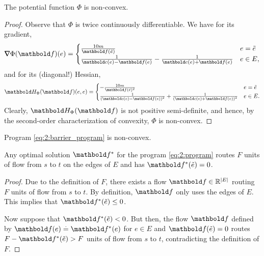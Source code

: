 \documentclass[nobib]{tufte-handout}
\newcommand{\etil}{\Tilde{e}}
\begin{document}
\begin{lem}
The potential function $\Phi$ is non-convex.
\end{lem}
\begin{proof}
Observe that $\Phi$ is twice continuously differentiable. We have for its gradient, \begin{align}
    \grad \Phi(\vf)(e) = \begin{cases}
        \frac{10 m}{\vf(\etil)} & e = \etil \\
        \frac{1}{\vc(e) - \vf(e)} - \frac{1}{\vc(e) + \vf(e)} & e \in E, \\
    \end{cases} \label{eq:2:gradient}
\end{align} and for its (diagonal!) Hessian, \begin{align}
    \mH_\Phi(\vf)(e,e) = \begin{cases}
        -\frac{10 m}{\vf(\etil)^2} & e = \etil \\
        \frac{1}{(\vc(e) - \vf(e))^2} + \frac{1}{(\vc(e) + \vf(e))^2} & e \in E. \\
    \end{cases} \label{eq:2:hessian}
\end{align} Clearly, $\mH_\Phi(\vf)$ is not positive semi-definite, and hence, by the second-order characterization of convexity, $\Phi$ is non-convex.
\end{proof}

\begin{cor}
Program \eqref{eq:2:barrier_program} is non-convex.
\end{cor}

\begin{lem}
Any optimal solution $\s{\vf}$ for the program \eqref{eq:2:program} routes $F$ units of flow from $s$ to $t$ on the edges of $E$ and has $\s{\vf}(\etil) = 0$.
\end{lem}
\begin{proof}
Due to the definition of $F$, there exists a flow $\vf \in \R^{|E|}$ routing $F$ units of flow from $s$ to $t$. By definition, $\vf$ only uses the edges of $E$. This implies that $\s{\vf}(\etil) \leq 0$.

Now suppose that $\s{\vf}(\etil) < 0$. But then, the flow $\vf$ defined by $\vf(e) \defeq \s{\vf}(e)$ for $e \in E$ and $\vf(\etil) = 0$ routes $F - \s{\vf}(\etil) > F$ units of flow from $s$ to $t$, contradicting the definition of $F$.
\end{proof}
\end{document}

